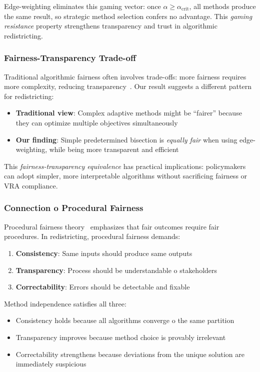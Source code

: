 Edge-weighting eliminates this gaming vector: once $\alpha \geq \alpha_{\text{crit}}$, all methods produce the same result, so strategic method selection confers no advantage. This \textit{gaming resistance} property strengthens transparency and trust in algorithmic redistricting.

\subsubsection{Fairness-Transparency Trade-off}

Traditional algorithmic fairness often involves trade-offs: more fairness requires more complexity, reducing transparency~\cite{lipton2018mythos}. Our result suggests a different pattern for redistricting:

\begin{itemize}
    \item \textbf{Traditional view}: Complex adaptive methods might be ``fairer'' because they can optimize multiple objectives simultaneously
    \item \textbf{Our finding}: Simple predetermined bisection is \textit{equally fair} when using edge-weighting, while being more transparent and efficient
\end{itemize}

This \textit{fairness-transparency equivalence} has practical implications: policymakers can adopt simpler, more interpretable algorithms without sacrificing fairness or VRA compliance.

\subsubsection{Connection 	o Procedural Fairness}

Procedural fairness theory~\cite{rawls1971theory,leventhal1980fairness} emphasizes that fair outcomes require fair procedures. In redistricting, procedural fairness demands:

\begin{enumerate}
    \item \textbf{Consistency}: Same inputs should produce same outputs
    \item \textbf{Transparency}: Process should be understandable 	o stakeholders
    \item \textbf{Correctability}: Errors should be detectable and fixable
\end{enumerate}

Method independence satisfies all three:
\begin{itemize}
    \item Consistency holds because all algorithms converge 	o the same partition
    \item Transparency improves because method choice is provably irrelevant
    \item Correctability strengthens because deviations from the unique solution are immediately suspicious
\end{itemize}

